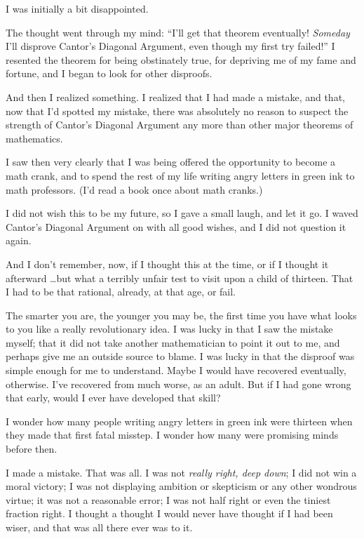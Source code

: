 {
 I was initially a bit disappointed.}

{
 The thought went through my mind:
``I'll get that theorem eventually!
\textit{Someday} I'll disprove Cantor's
Diagonal Argument, even though my first try failed!''
I resented the theorem for being obstinately true, for depriving me of
my fame and fortune, and I began to look for other disproofs.}

{
 And then I realized something. I realized that I had made a
mistake, and that, now that I'd spotted my mistake,
there was absolutely no reason to suspect the strength of
Cantor's Diagonal Argument any more than other major
theorems of mathematics.}

{
 I saw then very clearly that I was being offered the opportunity
to become a math crank, and to spend the rest of my life writing angry
letters in green ink to math professors. (I'd read a
book once about math cranks.)}

{
 I did not wish this to be my future, so I gave a small laugh, and
let it go. I waved Cantor's Diagonal Argument on with
all good wishes, and I did not question it again.}

{
 And I don't remember, now, if I thought this at
the time, or if I thought it afterward \ldots but what a terribly unfair
test to visit upon a child of thirteen. That I had to be that rational,
already, at that age, or fail.}

{
 The smarter you are, the younger you may be, the first time you
have what looks to you like a really revolutionary idea. I was lucky in
that I saw the mistake myself; that it did not take another
mathematician to point it out to me, and perhaps give me an outside
source to blame. I was lucky in that the disproof was simple enough for
me to understand. Maybe I would have recovered eventually, otherwise.
I've recovered from much worse, as an adult. But if I
had gone wrong that early, would I ever have developed that skill?}

{
 I wonder how many people writing angry letters in green ink were
thirteen when they made that first fatal misstep. I wonder how many
were promising minds before then.}

{
 I made a mistake. That was all. I was not \textit{really right,
deep down}; I did not win a moral victory; I was not displaying
ambition or skepticism or any other wondrous virtue; it was not a
reasonable error; I was not half right or even the tiniest fraction
right. I thought a thought I would never have thought if I had been
wiser, and that was all there ever was to it.}

